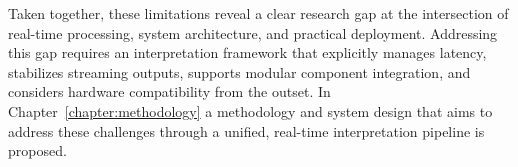 

Taken together, these limitations reveal a clear research gap at the intersection of real-time processing, system architecture, and practical deployment. Addressing this gap requires an interpretation framework that explicitly manages latency, stabilizes streaming outputs, supports modular component integration, and considers hardware compatibility from the outset. In Chapter~\ref{chapter:methodology} a methodology and system design that aims to address these challenges through a unified, real-time interpretation pipeline is proposed.

